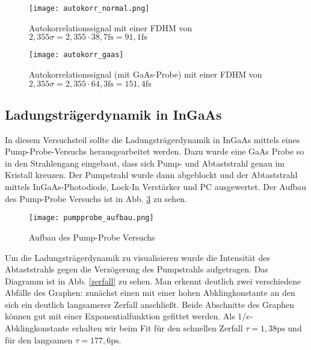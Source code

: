 \documentclass[a4paper,12pt]{scrartcl}
\begin{document}
\begin{figure}[H]
	\begin{center}
		\texttt{[image: autokorr\_normal.png]}
		\caption{Autokorrelationssignal mit einer FDHM von $2,355\sigma=2,355\cdot 38,7\si{\femto\second}=91,1\si{\femto\second}$}
		\label{autokorr_normal}
	\end{center}
\end{figure}
	
\begin{figure}[H]
	\begin{center}
		\texttt{[image: autokorr\_gaas]}
		\caption{Autokorrelationssignal (mit GaAs-Probe) mit einer FDHM von $2,355\sigma=2,355\cdot 64,3\si{\femto\second}=151,4\si{\femto\second}$}
		\label{autokorr_gaas}
	\end{center}
\end{figure}
	
\subsection{Ladungsträgerdynamik in InGaAs}	
In diesem Versuchsteil sollte die Ladungsträgerdynamik in InGaAs mittels eines Pump-Probe-Versuchs herausgearbeitet werden. Dazu wurde eine GaAs Probe so in den Strahlengang eingebaut, dass sich Pump- und Abtaststrahl genau im Kristall kreuzen. Der Pumpstrahl wurde dann abgeblockt und der Abtaststrahl mittels InGaAs-Photodiode, Lock-In Verstärker und PC ausgewertet. Der Aufbau des Pump-Probe Versuchs ist in Abb. \ref{pp_aufbau} zu sehen.

\begin{figure}[h]
	\begin{center}
		\texttt{[image: pumpprobe\_aufbau.png]}
		\caption{Aufbau des Pump-Probe Versuchs}
		\label{pp_aufbau}
	\end{center}
\end{figure}

Um die Ladungsträgerdynamik zu visualisieren wurde die Intensität des Abtaststrahls gegen die Verzögerung des Pumpstrahls aufgetragen. Das Diagramm ist in Abb. \ref{zerfall} zu sehen. Man erkennt deutlich zwei verschiedene Abfälle des Graphen: zunächst einen mit einer hohen Abklingkonstante an den sich ein deutlich langsamerer Zerfall anschließt. Beide Abschnitte des Graphen können gut mit einer Exponentialfunktion gefittet werden. Als $1/e$-Abklingkonstante erhalten wir beim Fit für den schnellen Zerfall $\tau=1,38\si{\pico\second}$ und für den langsamen $\tau=177,6\si{\pico\second}$. 
\end{document}
